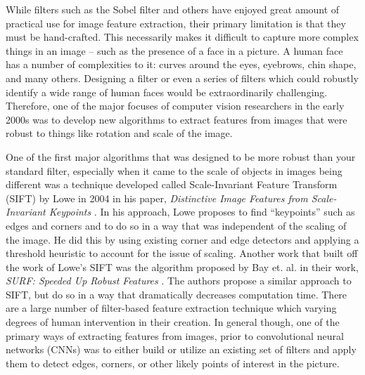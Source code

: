 \documentclass[../thesis.tex]{subfiles}
\begin{document}
While filters such as the Sobel filter and others have enjoyed great amount of practical use for image feature extraction, their primary limitation is that they must be hand-crafted. This necessarily makes it difficult to capture more complex things in an image -- such as the presence of a face in a picture. A human face has a number of complexities to it: curves around the eyes, eyebrows, chin shape, and many others. Designing a filter or even a series of filters which could robustly identify a wide range of human faces would be extraordinarily challenging. Therefore, one of the major focuses of computer vision researchers in the early 2000s was to develop new algorithms to extract features from images that were robust to things like rotation and scale of the image.

One of the first major algorithms that was designed to be more robust than your standard filter, especially when it came to the scale of objects in images being different was a technique developed called Scale-Invariant Feature Transform (SIFT) by Lowe in 2004 in his paper, \textit{Distinctive Image Features from Scale-Invariant Keypoints} \cite{lowe2004distinctive}. In his approach, Lowe proposes to find ``keypoints'' such as edges and corners and to do so in a way that was independent of the scaling of the image. He did this by using existing corner and edge detectors and applying a threshold heuristic to account for the issue of scaling. Another work that built off the work of Lowe's SIFT was the algorithm proposed by Bay et. al. in their work, \textit{SURF: Speeded Up Robust Features} \cite{bay2006surf}. The authors propose a similar approach to SIFT, but do so in a way that dramatically decreases computation time. There are a large number of filter-based feature extraction technique which varying degrees of human intervention in their creation. In general though, one of the primary ways of extracting features from images, prior to convolutional neural networks (CNNs) was to either build or utilize an existing set of filters and apply them to detect edges, corners, or other likely points of interest in the picture.
\end{document}
